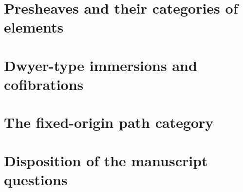 \documentclass[11pt,a4paper]{article}
\theoremstyle{definition}
\begin{document}
\section{Presheaves and their categories of elements}

\section{Dwyer-type immersions and cofibrations}


\section{The fixed-origin path category}

\section{Disposition of the manuscript questions}



\end{document}
